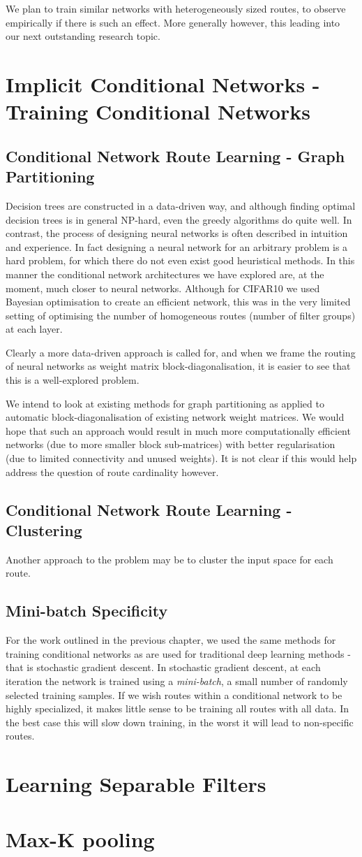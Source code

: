 \documentclass[thesis]{subfiles}
\begin{document}
We plan to train similar networks with heterogeneously sized routes, to observe empirically if there is such an effect. More generally however, this leading into our next outstanding research topic.
\section{Implicit Conditional Networks - Training Conditional Networks}
\subsection{Conditional Network Route Learning - Graph Partitioning}
Decision trees are constructed in a data-driven way, and although finding optimal decision trees is in general NP-hard, even the greedy algorithms do quite well. In contrast, the process of designing neural networks is often described in intuition and experience. In fact designing a neural network for an arbitrary problem is a hard problem, for which there do not even exist good heuristical methods. In this manner the conditional network architectures we have explored are, at the moment, much closer to neural networks. Although for CIFAR10 we used Bayesian optimisation to create an efficient network, this was in the very limited setting of optimising the number of homogeneous routes (number of filter groups) at each layer.

Clearly a more data-driven approach is called for, and when we frame the routing of neural networks as weight matrix block-diagonalisation, it is easier to see that this is a well-explored problem. 

We intend to look at existing methods for graph partitioning as applied to automatic block-diagonalisation of existing network weight matrices. We would hope that such an approach would result in much more computationally efficient networks (due to more smaller block sub-matrices) with better regularisation (due to limited connectivity and unused weights). It is not clear if this would help address the question of route cardinality however.

\subsection{Conditional Network Route Learning - Clustering}
Another approach to the problem may be to cluster the input space for each route.
\subsection{Mini-batch Specificity}
For the work outlined in the previous chapter, we used the same methods for training conditional networks as are used for traditional deep learning methods - that is stochastic gradient descent. In stochastic gradient descent, at each iteration the network is trained using a \emph{mini-batch}, \ie a small number of randomly selected training samples. If we wish routes within a conditional network to be highly specialized, it makes little sense to be training all routes with all data. In the best case this will slow down training, in the worst it will lead to non-specific routes.


\section{Learning Separable Filters}
\section{Max-K pooling}
\end{document}
